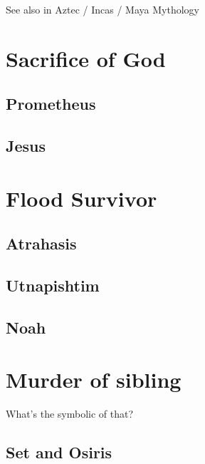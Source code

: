 \documentclass[
]{book}
\begin{document}
See also in Aztec / Incas / Maya Mythology

\hypertarget{sacrifice-of-god}{%
\section{Sacrifice of God}\label{sacrifice-of-god}}

\hypertarget{prometheus}{%
\subsection{Prometheus}\label{prometheus}}

\hypertarget{jesus}{%
\subsection{Jesus}\label{jesus}}

\hypertarget{flood-survivor}{%
\section{Flood Survivor}\label{flood-survivor}}

\hypertarget{atrahasis}{%
\subsection{Atrahasis}\label{atrahasis}}

\hypertarget{utnapishtim}{%
\subsection{Utnapishtim}\label{utnapishtim}}

\hypertarget{noah}{%
\subsection{Noah}\label{noah}}

\hypertarget{murder-of-sibling}{%
\section{Murder of sibling}\label{murder-of-sibling}}

What's the symbolic of that?

\hypertarget{set-and-osiris}{%
\subsection{Set and Osiris}\label{set-and-osiris}}
\end{document}
